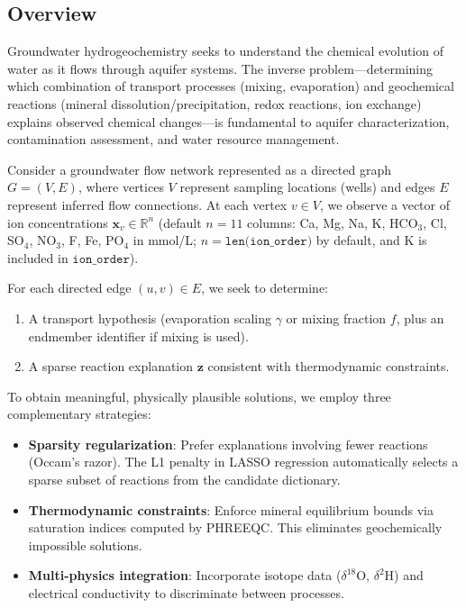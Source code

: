 \documentclass[12pt,a4paper]{article}
\theoremstyle{plain}
\theoremstyle{definition}
\theoremstyle{remark}
\begin{document}
\subsection{Overview}\label{sec:overview}
Groundwater hydrogeochemistry seeks to understand the chemical evolution of water as it flows through aquifer systems. The inverse problem---determining which combination of transport processes (mixing, evaporation) and geochemical reactions (mineral dissolution/precipitation, redox reactions, ion exchange) explains observed chemical changes---is fundamental to aquifer characterization, contamination assessment, and water resource management.

Consider a groundwater flow network represented as a directed graph $G = (V, E)$, where vertices $V$ represent sampling locations (wells) and edges $E$ represent inferred flow connections. At each vertex $v \in V$, we observe a vector of ion concentrations $\mathbf{x}_v \in \mathbb{R}^n$ (default $n=11$ columns: Ca, Mg, Na, K, HCO$_3$, Cl, SO$_4$, NO$_3$, F, Fe, PO$_4$ in mmol/L; $n = \texttt{len(ion\_order)}$ by default, and K is included in $\texttt{ion\_order}$).

For each directed edge $(u,v) \in E$, we seek to determine:
\begin{enumerate}
	\item A transport hypothesis (evaporation scaling $\gamma$ or mixing fraction $f$, plus an endmember identifier if mixing is used).
	\item A sparse reaction explanation $\mathbf{z}$ consistent with thermodynamic constraints.
\end{enumerate}

To obtain meaningful, physically plausible solutions, we employ three complementary strategies:
\begin{itemize}
	\item \textbf{Sparsity regularization}: Prefer explanations involving fewer reactions (Occam's razor). The L1 penalty in LASSO regression automatically selects a sparse subset of reactions from the candidate dictionary.
	\item \textbf{Thermodynamic constraints}: Enforce mineral equilibrium bounds via saturation indices computed by PHREEQC. This eliminates geochemically impossible solutions.
	\item \textbf{Multi-physics integration}: Incorporate isotope data ($\delta^{18}$O, $\delta^2$H) and electrical conductivity to discriminate between processes.
\end{itemize}
\end{document}
